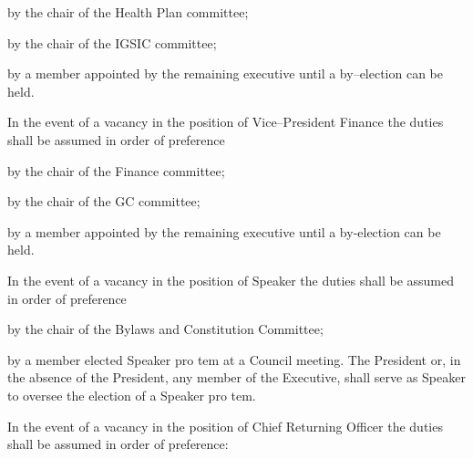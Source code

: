 \begin{longenum}[ label*=\thesubsection.\arabic*., align=left]
\begin{longenum}[ label*=\arabic*., align=left]
\begin{longenum}[ label*=\arabic*., align=left]
				\item by the chair of the Health Plan committee;
				\item by the chair of the IGSIC committee;
				\item by a member appointed by the remaining executive until a by--election can be held.
			\end{longenum}
			\item In the event of a vacancy in the position of Vice--President Finance the duties shall be assumed in order of preference
			\begin{longenum}[ label*=\arabic*., align=left]
				\item by the chair of the Finance committee;
				\item by the chair of the GC committee;
				\item by a member appointed by the remaining executive until a by-election can be held.
			\end{longenum}
			\item In the event of a vacancy in the position of Speaker the duties shall be assumed in order of preference
			\begin{longenum}[ label*=\arabic*., align=left]
				\item by the chair of the Bylaws and Constitution Committee;
				\item by a member elected Speaker pro tem at a Council meeting. The President or, in the absence of the President, any member of the Executive, shall serve as Speaker to oversee the election of a Speaker pro tem.
			\end{longenum}
			\item In the event of a vacancy in the position of Chief Returning Officer the duties shall be assumed in order of preference:
			\begin{longenum}[ label*=\arabic*., align=left]

\end{longenum}
\end{longenum}
\end{longenum}
